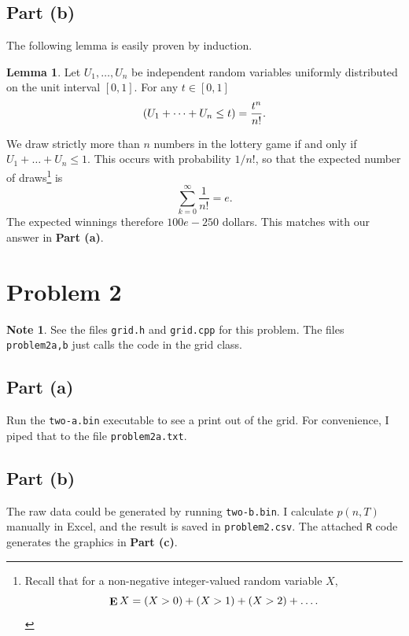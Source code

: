 \documentclass{article}
\theoremstyle{definition}
\newtheorem*{lemma}{Lemma}
\newtheorem*{note}{Note}
\let\P=\relax
\DeclareMathOperator{\E}{\mathbf{E}}
\DeclareMathOperator{\P}{\mathbf{P}}
\begin{document}
\subsection{Part (b)}
The following lemma is easily proven by induction. 
\begin{lemma}
Let $U_1, \dots, U_n$ be independent random variables uniformly distributed
on the unit interval $[0, 1]$. For any $t \in [0, 1]$
\begin{equation}
\P(U_1 + \dots + U_n \leq t) = \frac{t^n}{n!}.
\end{equation}
\end{lemma}

We draw strictly more than $n$ numbers
in the lottery game if and only if $U_1 + \dots + U_n \leq 1$. This occurs
with probability $1/n!$, so that the expected number of draws\footnote{Recall that
for a non-negative integer-valued random variable $X$,
\begin{equation*}
  \E X = \P(X > 0) + \P(X > 1) + \P(X > 2) + \dots.
\end{equation*}} is
\begin{equation}
\sum_{k=0}^{\infty} \frac{1}{n!} = e.
\end{equation}
The expected winnings therefore $100 e - 250$ dollars. This matches with our
answer in \textbf{Part (a)}.

\section{Problem 2}
\begin{note}
See the files \texttt{grid.h} and \texttt{grid.cpp} for this problem.
The files \texttt{problem2{a,b}} just calls the code in the grid class.
\end{note}

\subsection{Part (a)}
Run the \texttt{two-a.bin} executable to see a print out
of the grid. For convenience, I piped that to the file
\texttt{problem2a.txt}.

\subsection{Part (b)}
The raw data could be generated by running \texttt{two-b.bin}.
I calculate $p(n,T)$ manually in Excel, and the result is saved
in \texttt{problem2.csv}. The attached \texttt{R} code generates the graphics
in \textbf{Part (c)}.
\end{document}
